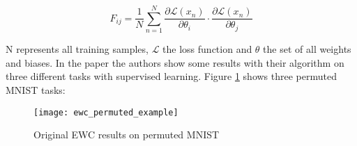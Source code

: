 \begin{equation}
    F_{ij} = \frac{1}{N} \sum_{n=1}^{N} \frac{\partial \mathcal{L} \left( x_n \right) }{\partial \theta_{i}} \cdot \frac{\partial \mathcal{L} \left( x_n \right) }{\partial \theta_{j}}
\end{equation}

N represents all training samples, $\mathcal{L}$ the loss function and $\theta$ the set of all weights and biases.
In the paper the authors show some results with their algorithm on three different tasks with supervised learning. Figure \ref{fig:ewc_permuted_example} shows three permuted MNIST tasks:
\begin{figure}[H]
    \centering
    \texttt{[image: ewc\_permuted\_example]}
    \caption{\cite{elastic-weight-consolidation} Original EWC results on permuted MNIST}
    \label{fig:ewc_permuted_example}
\end{figure}